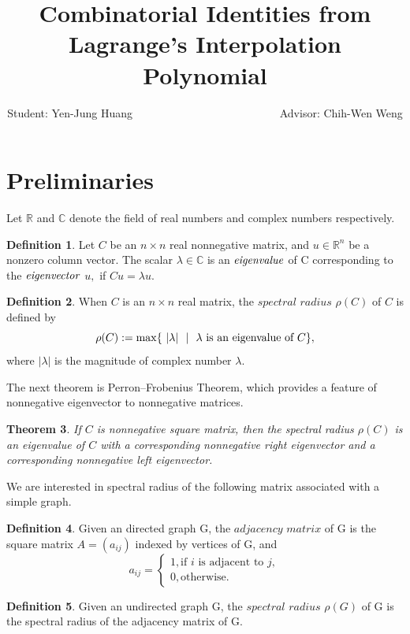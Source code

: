 \documentclass{article}
\title{Combinatorial Identities from Lagrange's Interpolation Polynomial}
\author{Student: Yen-Jung Huang  ~~~~~~~~~~~~~~~~~~~~~~~~~~Advisor: Chih-Wen Weng}
\date{} %
\theoremstyle{plain}
\newtheorem{thm}{Theorem}[section]
\theoremstyle{definition}
\newtheorem{defn}[thm]{Definition}
\begin{document}
\section{Preliminaries}
    
Let $\mathbb{R}$ and $\mathbb{C}$ denote the
 field of real numbers and complex numbers respectively.



\begin{defn}       
Let $C$ be an $n \times n$ real nonnegative matrix, and $u \in \mathbb{R}^n$ be a
 nonzero column vector. The scalar $\lambda \in \mathbb{C}$ is an $\it{eigenvalue}$ 
of C corresponding to the $\it{eigenvector}$ $u,$  if $Cu = \lambda u.$
        

\end{defn}


\begin{defn} \cite{spec_rad}
    When $C$ is an $n \times n$ real matrix, the $\textit {spectral radius} $ $\rho(C)$
        of $C$ is defined by 
        $$\rho(C):=\max\{~|\lambda|~\ |~~\lambda\hbox{ is an eigenvalue of $C$}\},$$
    where $|\lambda|$ is the magnitude of complex number $\lambda.$
\end{defn}

    
The next theorem is Perron–Frobenius Theorem, which provides a feature of
 nonnegative eigenvector to nonnegative matrices.
\begin{thm} \cite{chang} \cite{prn_fros2} \label{thm:Perron_Frobenius}
    If $C$ is nonnegative square matrix, then the spectral radius $\rho(C)$ is an
    eigenvalue of $C$ with a corresponding nonnegative right eigenvector and a
    corresponding nonnegative left eigenvector.
\end{thm}

We are interested in spectral radius of the following matrix associated with a simple graph.

\begin{defn} 
    Given an directed graph G, the$\textit{ adjacency matrix}$ of G is the square 
    matrix $A = (a_{ij})$ indexed by vertices of G, and
     \[a_{ij} =\begin{cases} 
        1, \text{if $i$ is adjacent to $j$}, \\
        0, \text{otherwise.}
            \end{cases}
     \]
\end{defn}
    
\begin{defn}
Given an undirected graph G, the $\textit{spectral radius}$  $\rho(G) $ of G is the spectral
 radius of the adjacency matrix of G.
\end{defn}
\end{document}
